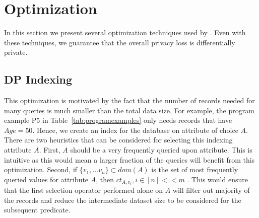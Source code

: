 \section{Optimization}\label{sec:optimization}
In this section we present several optimization techniques used by \system. Even with these techniques, we guarantee that the overall privacy loss is differentially private.

\subsection{DP Indexing} 
This optimization is motivated by the fact that the number of records needed for many queries is much smaller than the total data size.  For example, the program example P5 in Table~\ref{tab:programexamples} only needs records that have $Age=50$. Hence, we create an index for the database on attribute of choice $A$. There are two heuristics that can be considered for selecting this indexing attribute $A$. First, $A$ should be a very frequently queried upon attribute. This is intuitive as this would mean a larger fraction of the queries will benefit from this optimization. Second, if $\{v_1,...v_n\} \subset dom(A)$ is the set of most frequently queried values for attribute $A$, then $ct_{A,v_i}, i \in [n] << m$ . This would ensure that the first selection operator performed alone on $A$ will filter out majority of the records and reduce the intermediate dataset size to be considered for the subsequent predicate. 


